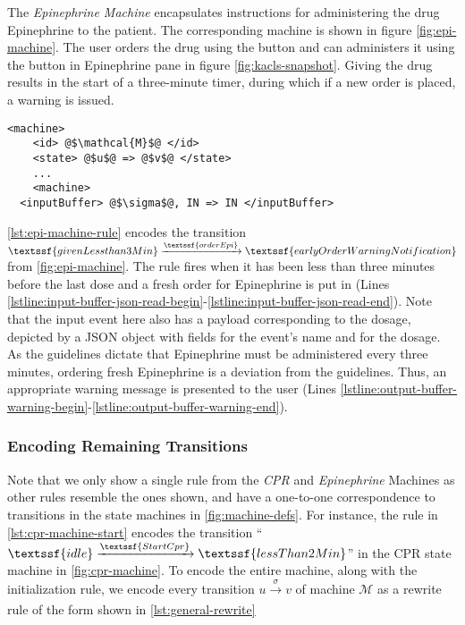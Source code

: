 The \textit{Epinephrine Machine} encapsulates instructions for administering
the drug Epinephrine to the patient. The corresponding machine is shown in figure
\ref{fig:epi-machine}. The user orders the drug using the
 button and can administers it using the  button in
Epinephrine pane in figure \ref{fig:kacls-snapshot}. Giving the drug results in the
start of a three-minute timer, during which if a new order is placed, a warning
is issued.

\begin{lstlisting}[float=b!,
  frame=single,
  style=ksty,
  language=k,
  label={lst:general-rewrite},
  caption={Transitions as $\K$-Rules}
]
  <machine>
    <id> @$\mathcal{M}$@ </id>
    <state> @$u$@ => @$v$@ </state>
    ...
    <machine>
  <inputBuffer> @$\sigma$@, IN => IN </inputBuffer>
\end{lstlisting}

\autoref{lst:epi-machine-rule} encodes the transition
$\textssf{givenLessthan3Min} \xrightarrow[]{\textssf{orderEpi}}
\textssf{earlyOrderWarningNotification}$ from \autoref{fig:epi-machine}.
The rule fires when it has been less than three minutes
before the last dose and a fresh order for
Epinephrine is put in (Lines
\ref{lstline:input-buffer-json-read-begin}-\ref{lstline:input-buffer-json-read-end}).
Note that the input event here also has a payload corresponding to the dosage,
depicted by a JSON object with fields  for the event's name
and  for the dosage.
As the guidelines dictate that Epinephrine must be administered
every three minutes, ordering fresh Epinephrine is a deviation from the
guidelines. Thus, an appropriate warning message is presented to the user (Lines
\ref{lstline:output-buffer-warning-begin}-\ref{lstline:output-buffer-warning-end}).

\subsubsection{Encoding Remaining Transitions}

Note that we only show a single rule from the \textit{CPR} and
\textit{Epinephrine} Machines as other rules resemble the ones
shown, and have a one-to-one correspondence to transitions in the
state machines in \autoref{fig:machine-defs}. For instance,
the rule in \autoref{lst:cpr-machine-start} encodes the transition
``$\textssf{idle} \xrightarrow[]{\textssf{StartCpr}} \textssf{lessThan2Min}$'' in the
CPR state machine in \autoref{fig:cpr-machine}. To encode the entire machine,
along with the initialization rule,
we encode every transition $u \xrightarrow[]{\sigma} v$
of machine $\mathcal{M}$ as a rewrite rule of the form shown in
\autoref{lst:general-rewrite}

